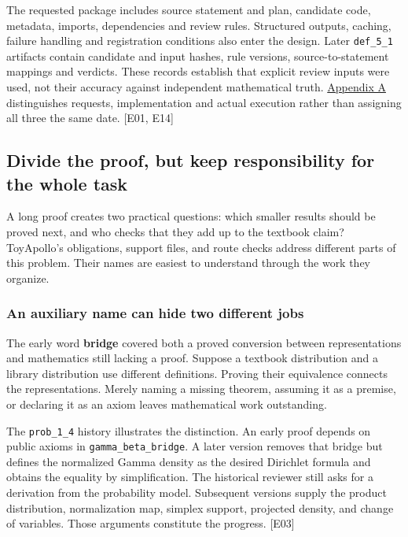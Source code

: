 The requested package includes source statement and plan, candidate code, metadata, imports, dependencies and review rules. Structured outputs, caching, failure handling and registration conditions also enter the design. Later \nolinkurl{def_5_1} artifacts contain candidate and input hashes, rule versions, source-to-statement mappings and verdicts. These records establish that explicit review inputs were used, not their accuracy against independent mathematical truth. \hyperlink{appendix-a}{Appendix A} distinguishes requests, implementation and actual execution rather than assigning all three the same date. [E01, E14]

\subsection[Divide the proof, but keep responsibility for the whole task]{\texorpdfstring{\protect\hypertarget{l2}{}Divide the proof, but keep responsibility for the whole task}{Divide the proof, but keep responsibility for the whole task}}
A long proof creates two practical questions: which smaller results should be proved next, and who checks that they add up to the textbook claim? ToyApollo's obligations, support files, and route checks address different parts of this problem. Their names are easiest to understand through the work they organize.

\subsubsection[An auxiliary name can hide two different jobs]{\texorpdfstring{\protect\hypertarget{l2-1}{}An auxiliary name can hide two different jobs}{An auxiliary name can hide two different jobs}}
The early word \textbf{bridge} covered both a proved conversion between representations and mathematics still lacking a proof. Suppose a textbook distribution and a library distribution use different definitions. Proving their equivalence connects the representations. Merely naming a missing theorem, assuming it as a premise, or declaring it as an axiom leaves mathematical work outstanding.

The \nolinkurl{prob_1_4} history illustrates the distinction. An early proof depends on public axioms in \nolinkurl{gamma_beta_bridge}. A later version removes that bridge but defines the normalized Gamma density as the desired Dirichlet formula and obtains the equality by simplification. The historical reviewer still asks for a derivation from the probability model. Subsequent versions supply the product distribution, normalization map, simplex support, projected density, and change of variables. Those arguments constitute the progress. [E03]

